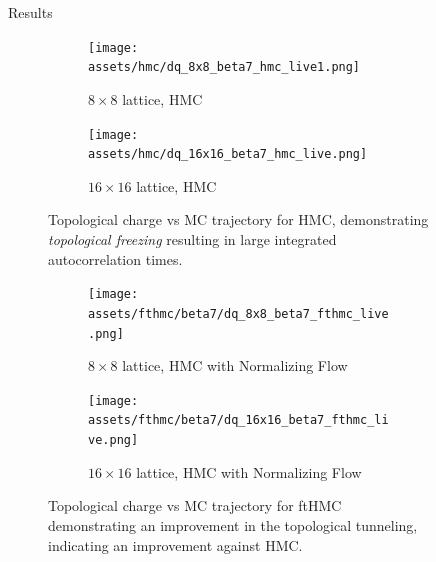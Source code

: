 \documentclass[final]{beamer}
\newlength{\sepwidth}
\newlength{\colwidth}
\newcommand{\separatorcolumn}{\begin{column}{\sepwidth}\end{column}}
\begin{document}
\begin{frame}[t]
\begin{columns}[t]
\begin{column}{\colwidth}
\end{column}

\separatorcolumn

\begin{column}{\colwidth}
  \begin{block}{Results}
    \begin{figure}
      \begin{subfigure}{0.45\columnwidth}
        \centering
        \texttt{[image: assets/hmc/dq\_8x8\_beta7\_hmc\_live1.png]}
        \caption{\label{fig:hmc8beta7}\(8\times8\) lattice, HMC}
      \end{subfigure}
      \begin{subfigure}{0.45\columnwidth}
        \centering
        \texttt{[image: assets/hmc/dq\_16x16\_beta7\_hmc\_live.png]}
        \caption{\label{fig:hmc16beta7}\(16\times16\) lattice, HMC}
      \end{subfigure}
      \caption{Topological charge vs MC trajectory for HMC, demonstrating \emph{topological freezing} resulting in large
      integrated autocorrelation times.}
    \end{figure}
    \begin{figure}
      \begin{subfigure}{0.45\columnwidth}
        \centering
          \texttt{[image: assets/fthmc/beta7/dq\_8x8\_beta7\_fthmc\_live.png]}
          \caption{\label{fig:fthmc8beta7}\(8\times8\) lattice, HMC with Normalizing Flow}
      \end{subfigure}
      \begin{subfigure}{0.45\columnwidth}
        \centering
        \texttt{[image: assets/fthmc/beta7/dq\_16x16\_beta7\_fthmc\_live.png]}
        \caption{\label{fig:fthmc16beta7}\(16\times16\) lattice, HMC with Normalizing Flow}
      \end{subfigure}
      \caption{Topological charge vs MC trajectory for ftHMC demonstrating an improvement in the topological tunneling,
      indicating an improvement against HMC.}
    \end{figure}
  \end{block}


\end{column}
\end{columns}
\end{frame}
\end{document}
